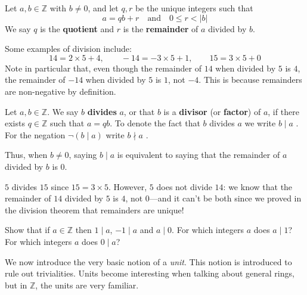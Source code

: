 \begin{definition}
\label{defQuotientRemainder}
Let $a,b \in \mathbb{Z}$ with $b \ne 0$, and let $q,r$ be the unique integers such that
\[ a = qb+r \quad \text{and} \quad 0 \le r < |b| \]
We say $q$ is the \textbf{quotient} and $r$ is the \textbf{remainder} of $a$ divided by $b$.
\end{definition}

\begin{example}
Some examples of division include:
\[ 14 = 2 \times 5 + 4, \qquad -14 = -3 \times 5 + 1, \qquad 15 = 3 \times 5 + 0 \]
Note in particular that, even though the remainder of $14$ when divided by $5$ is $4$, the remainder of $-14$ when divided by $5$ is $1$, not $-4$. This is because remainders are non-negative by definition.
\end{example}

\begin{definition}
\label{defDivision}
Let $a,b \in \mathbb{Z}$. We say $b$ \textbf{divides} $a$, or that $b$ is a \textbf{divisor} (or \textbf{factor}) of $a$, if there exists $q \in \mathbb{Z}$ such that $a=qb$. To denote the fact that $b$ divides $a$ we write $b \mid a$ . For the negation $\neg (b \mid a)$ write $b \nmid a$ .
\end{definition}

Thus, when $b \ne 0$, saying $b \mid a$ is equivalent to saying that the remainder of $a$ divided by $b$ is $0$.

\begin{example}
$5$ divides $15$ since $15 = 3 \times 5$. However, $5$ does not divide $14$: we know that the remainder of $14$ divided by $5$ is $4$, not $0$---and it can't be both since we proved in the division theorem that remainders are unique!
\end{example}

\begin{exercise}
\label{exOneDivDivZero}
Show that if $a \in \mathbb{Z}$ then $1 \mid a$, $-1 \mid a$ and $a \mid 0$. For which integers $a$ does $a \mid 1$? For which integers $a$ does $0 \mid a$?
\end{exercise}

We now introduce the very basic notion of a \textit{unit}. This notion is introduced to rule out trivialities. Units become interesting when talking about general rings, but in $\mathbb{Z}$, the units are very familiar.

